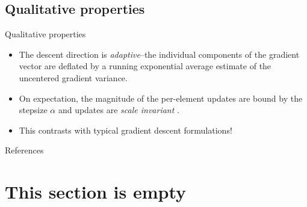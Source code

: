 \documentclass{beamer}
\numberwithin{equation}{section}
\begin{document}
\subsection{Qualitative properties}

\begin{frame}{Qualitative properties}
    \begin{itemize}
        \item
        The descent direction is \textit{adaptive}--the individual components
        of the gradient vector are deflated by a running exponential average
        estimate of the uncentered gradient variance.

        \item
        On expectation, the magnitude of the per-element updates are bound by
        the stepsize $ \alpha $ and updates are \textit{scale invariant}
        \cite{kingma_ba_adam}.

        \item
        This contrasts with typical gradient descent formulations!
    \end{itemize}
\end{frame}

\begin{frame}{References}
    
    
\end{frame}

\section{This section is empty}
\end{document}
